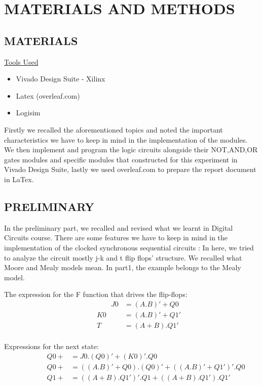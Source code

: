 \documentclass[pdftex,12pt,a4paper]{article}
\begin{document}
\section{MATERIALS AND METHODS}

\subsection{MATERIALS}
\underline{Tools Used}
\begin{itemize}
    \item {Vivado Design Suite - Xilinx}
    \item{Latex (overleaf.com)}
    \item{Logisim}
\end{itemize}
Firstly we recalled the aforementioned topics and noted the important characteristics we have to keep in mind in the implementation of the modules. We then implement and program the logic circuits alongside their NOT,AND,OR gates modules and specific modules that constructed for this experiment in Vivado Design Suite, lastly we used overleaf.com to prepare the report document in LaTex.

\subsection{PRELIMINARY}
In the preliminary part, we recalled and revised what we learnt in Digital Circuits course. There are some features we have to keep in mind in the implementation of the clocked synchronous sequential circuits :
In here, we tried to analyze the circuit mostly j-k and t flip flops' structure. We recalled what Moore and Mealy models mean. In part1, the example belongs to the Mealy model. 


The expression for the F function that drives the flip-flops:
\begin{align*}
\qquad\qquad J0 &= (A.B)' + Q0 \\
     \qquad K0 &= (A.B)' + Q1' \\
     \qquad T &= (A+B) . Q1' \\
\end{align*}

Expressions for the next state:
\begin{align*}
\qquad \qquad Q0+ &= J0.(Q0)' + (K0)'.Q0 \\
     \qquad \qquad Q0+ &= ((A.B)' + Q0).(Q0)' + ((A.B)' + Q1')'.Q0 \\
     \qquad \qquad Q1+ &= ((A+B) . Q1')'. Q1 + ((A+B) . Q1').Q1' \\
\end{align*}
\end{document}
